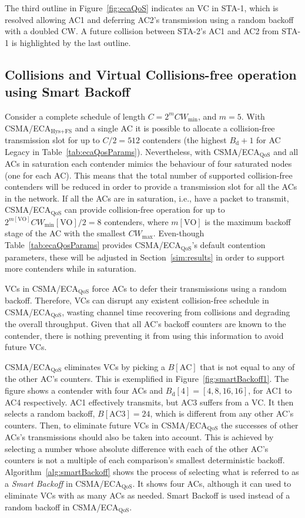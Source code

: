 The third outline in Figure~\ref{fig:ecaQoS} indicates an VC in STA-1, which is resolved allowing AC1 and deferring AC2's transmission using a random backoff with a doubled CW. A future collision between STA-2's AC1 and AC2 from STA-1 is highlighted by the last outline.

\subsection{Collisions and Virtual Collisions-free operation using Smart Backoff}\label{ECAqosCollisionFree}
Consider a complete schedule of length $C=2^{m}CW_{\min}$, and $m=5$. With CSMA/ECA$_{\text{Hys+FS}}$ and a single AC it is possible to allocate a collision-free transmission slot for up to $C/2=512$ contenders (the highest $B_{\text{d}}+1$ for AC Legacy in Table~\ref{tab:ecaQosParams}). Nevertheless, with CSMA/ECA$_{\text{QoS}}$ and all ACs in saturation each contender mimics the behaviour of four saturated nodes (one for each AC). This means that the total number of supported collision-free contenders will be reduced in order to provide a transmission slot for all the ACs in the network. If all the ACs are in saturation, i.e., have a packet to transmit, CSMA/ECA$_{\text{QoS}}$ can provide collision-free operation for up to $2^{m[\text{VO}]}CW_{\min}[\text{VO}]/2=8$ contenders, where $m[\text{VO}]$ is the maximum backoff stage of the AC with the smallest $CW_{\max}$. Even-though Table~\ref{tab:ecaQosParams} provides CSMA/ECA$_{\text{QoS}}$'s default contention parameters, these will be adjusted in Section~\ref{sim:results} in order to support more contenders while in saturation.

VCs in CSMA/ECA$_{\text{QoS}}$ force ACs to defer their transmissions using a random backoff. Therefore, VCs can disrupt any existent collision-free schedule in CSMA/ECA$_{\text{QoS}}$, wasting channel time recovering from collisions and degrading the overall throughput. Given that all AC's backoff counters are known to the contender, there is nothing preventing it from using this information to avoid future VCs.

CSMA/ECA$_{\text{QoS}}$ eliminates VCs by picking a $B[\text{AC}]$ that is not equal to any of the other AC's counters. This is exemplified in Figure~\ref{fig:smartBackoff1}. The figure shows a contender with four ACs and $B_{\text{d}}[4]=[4,8,16,16]$, for AC1 to AC4 respectively. AC1 effectively transmits, but AC3 suffers from a VC. It then selects a random backoff, $B[\text{AC3}]=24$, which is different from any other AC's counters. Then, to eliminate future VCs in CSMA/ECA$_{\text{QoS}}$ the successes of other ACs's transmissions should also be taken into account. This is achieved by selecting a number whose absolute difference with each of the other AC's counters is not a multiple of each comparison's smallest deterministic backoff. Algorithm~\ref{alg:smartBackoff} shows the process of selecting what is referred to as a \emph{Smart Backoff} in CSMA/ECA$_{\text{QoS}}$. It shows four ACs, although it can used to eliminate VCs with as many ACs as needed. Smart Backoff is used instead of a random backoff in CSMA/ECA$_{\text{QoS}}$.

